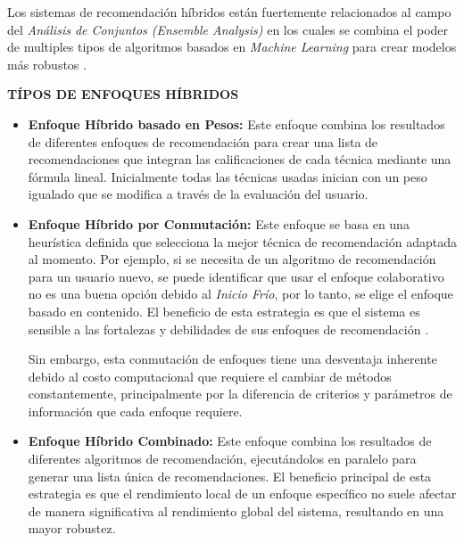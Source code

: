 Los sistemas de recomendación híbridos están fuertemente relacionados al campo del \textit{Análisis de Conjuntos (Ensemble Analysis)} en los cuales se combina el poder de multiples tipos de algoritmos basados en \textit{Machine Learning} para crear modelos más robustos \parencite{Aggarwal2016}.  

\textbf{TÍPOS DE ENFOQUES HÍBRIDOS}
\begin{itemize}
    \item \textbf{Enfoque Híbrido basado en Pesos: } Este enfoque combina los resultados de diferentes enfoques de recomendación para crear una lista de recomendaciones que integran las calificaciones de cada técnica mediante una fórmula lineal. Inicialmente todas las técnicas usadas inician con un peso igualado que se modifica a través de la evaluación del usuario.
    \item \textbf{Enfoque Híbrido por Conmutación: } Este enfoque se basa en una heurística definida que selecciona la mejor técnica de recomendación adaptada al momento. Por ejemplo, si se necesita de un algoritmo de recomendación para un usuario nuevo, se puede identificar que usar el enfoque colaborativo no es una buena opción debido al \textit{Inicio Frío}, por lo tanto, se elige el enfoque basado en contenido. El beneficio de esta estrategia es que el sistema es sensible a las fortalezas y debilidades de sus enfoques de recomendación \parencite{ISINKAYE2015261}. 

    Sin embargo, esta conmutación de enfoques tiene una desventaja inherente debido al costo computacional que requiere el cambiar de métodos constantemente, principalmente por la diferencia de criterios y parámetros de información que cada enfoque requiere.

    \item \textbf{Enfoque Híbrido Combinado: } Este enfoque combina los resultados de diferentes algoritmos de recomendación, ejecutándolos en paralelo para generar una lista única de recomendaciones. El beneficio principal de esta estrategia es que el rendimiento local de un enfoque específico no suele afectar de manera significativa al rendimiento global del sistema, resultando en una mayor robustez.
    
\end{itemize}